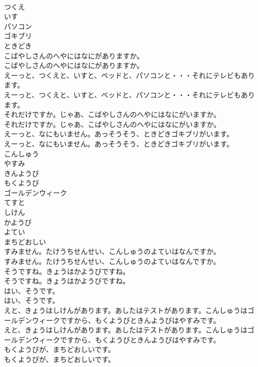 \documentclass[8pt]{extreport}
\begin{document}
\begin{CJK}{UTF8}{min}
\\	つくえ
\\	いす
\\	パソコン
\\	ゴキブリ
\\	ときどき
\\	こばやしさんのへやにはなにがありますか。	
\\	こばやしさんのへやにはなにがありますか。 
\\	えーっと、つくえと、いすと、ベッドと、パソコンと・・・それにテレビもあります。	
\\	えーっと、つくえと、いすと、ベッドと、パソコンと・・・それにテレビもあります。 
\\	それだけですか。じゃあ、こばやしさんのへやにはなにがいますか。	
\\	それだけですか。じゃあ、こばやしさんのへやにはなにがいますか。 
\\	えーっと、なにもいません。あっそうそう、ときどきゴキブリがいます。	
\\	えーっと、なにもいません。あっそうそう、ときどきゴキブリがいます。 
\\	こんしゅう
\\	やすみ
\\	きんようび
\\	もくようび
\\	ゴールデンウィーク
\\	てすと
\\	しけん
\\	かようび
\\	よてい
\\	まちどおしい
\\	すみません。たけうちせんせい、こんしゅうのよていはなんですか。	
\\	すみません。たけうちせんせい、こんしゅうのよていはなんですか。 
\\	そうですね。きょうはかようびですね。	
\\	そうですね。きょうはかようびですね。 
\\	はい、そうです。	
\\	はい、そうです。 
\\	えと、きょうはしけんがあります。あしたはテストがあります。こんしゅうはゴールデンウィークですから、もくようびときんようびはやすみです。	
\\	えと、きょうはしけんがあります。あしたはテストがあります。こんしゅうはゴールデンウィークですから、もくようびときんようびはやすみです。 
\\	もくようびが、まちどおしいです。	
\\	もくようびが、まちどおしいです。 

\end{CJK}
\end{document}
